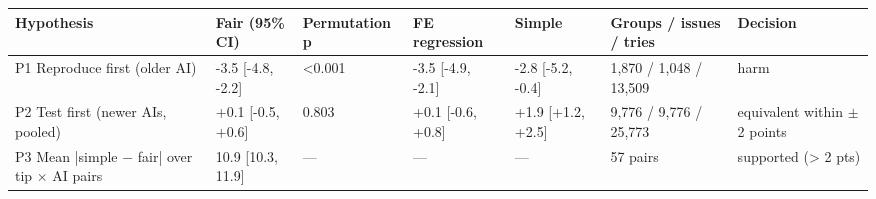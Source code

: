 \begin{tabular}{lllllll}
\toprule
Hypothesis & Fair (95\% CI) & Permutation p & FE regression & Simple & Groups / issues / tries & Decision \\
\midrule
P1 Reproduce first (older AI) & -3.5 [-4.8, -2.2] & <0.001 & -3.5 [-4.9, -2.1] & -2.8 [-5.2, -0.4] & 1,870 / 1,048 / 13,509 & harm \\
P2 Test first (newer AIs, pooled) & +0.1 [-0.5, +0.6] & 0.803 & +0.1 [-0.6, +0.8] & +1.9 [+1.2, +2.5] & 9,776 / 9,776 / 25,773 & equivalent within $\pm$2 points \\
P3 Mean |simple $-$ fair| over tip $\times$ AI pairs & 10.9 [10.3, 11.9] & — & — & — & 57 pairs & supported (> 2 pts) \\
\bottomrule
\end{tabular}
